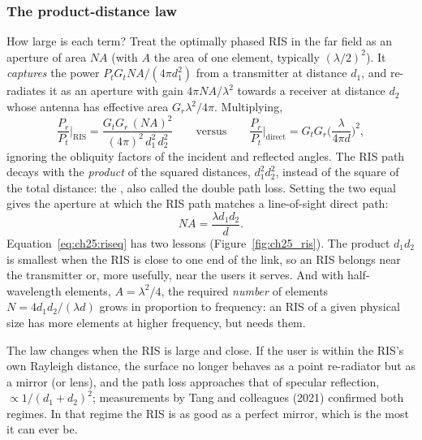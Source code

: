 \subsubsection{The product-distance law}
How large is each term? Treat the optimally phased RIS in the far field as an aperture of area $NA$
(with $A$ the area of one element, typically $(\lambda/2)^2$). It \emph{captures} the power
$P_tG_tNA/(4\pi d_1^2)$ from a transmitter at distance $d_1$, and re-radiates it as an aperture with
gain $4\pi NA/\lambda^2$ towards a receiver at distance $d_2$ whose antenna has effective area
$G_r\lambda^2/4\pi$. Multiplying,
\begin{equation}
\frac{P_r}{P_t}\bigg|_{\text{RIS}}=\frac{G_tG_r\,(NA)^2}{(4\pi)^2\,d_1^2\,d_2^2}
\qquad\text{versus}\qquad
\frac{P_r}{P_t}\bigg|_{\text{direct}}=G_tG_r\Big(\frac{\lambda}{4\pi d}\Big)^2,
\label{eq:ch25:productlaw}
\end{equation}
ignoring the obliquity factors of the incident and reflected angles. The RIS path decays with the
\emph{product} of the squared distances, $d_1^2d_2^2$, instead of the square of the total distance:
the , also called the double path loss. Setting the two equal gives the
aperture at which the RIS path matches a line-of-sight direct path:
\begin{equation}
NA=\frac{\lambda d_1d_2}{d}.
\label{eq:ch25:riseq}
\end{equation}
Equation~\eqref{eq:ch25:riseq} has two lessons (Figure~\ref{fig:ch25_ris}). The product $d_1d_2$ is
smallest when the RIS is close to one end of the link, so an RIS belongs near the transmitter or,
more usefully, near the users it serves. And with half-wavelength elements, $A=\lambda^2/4$, the
required \emph{number} of elements $N=4d_1d_2/(\lambda d)$ grows in proportion to frequency: an RIS
of a given physical size has more elements at higher frequency, but needs them.

The law changes when the RIS is large and close. If the user is within the RIS's own Rayleigh
distance, the surface no longer behaves as a point re-radiator but as a mirror (or lens), and the
path loss approaches that of specular reflection, $\propto1/(d_1+d_2)^2$; measurements by Tang and
colleagues (2021) confirmed both regimes. In that regime the RIS is as good as a perfect mirror,
which is the most it can ever be.

